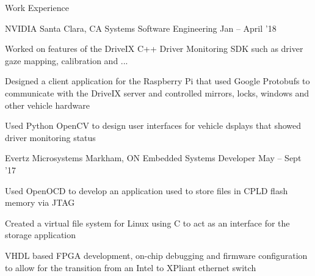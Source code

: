 \documentclass{resume} %
\begin{document}
	\begin{rSection}{Work Experience}
		\begin{rSubsection}{NVIDIA}
			{Santa Clara, CA}
			{Systems Software Engineering}
			{Jan -- April '18}
			
			\item Worked on features of the DriveIX C++ Driver Monitoring SDK such as driver gaze mapping, calibration and ...
            \item Designed a client application for the Raspberry Pi that used Google Protobufs to communicate with the DriveIX server and controlled mirrors, locks, windows and other vehicle hardware
            \item Used Python OpenCV to design user interfaces for vehicle dsplays that showed driver monitoring status   
		\end{rSubsection}
		
        \begin{rSubsection}{Evertz Microsystems}
			{Markham, ON}
			{Embedded Systems Developer}
			{May -- Sept '17}
			
			\item Used OpenOCD to develop an application used to store files in CPLD flash memory via JTAG
		 	\item Created a virtual file system for Linux using C to act as an interface for the storage application
			\item VHDL based FPGA development, on-chip debugging and firmware configuration to allow for the transition from an Intel to XPliant ethernet switch
		\end{rSubsection}
		

\end{rSection}
\end{document}
